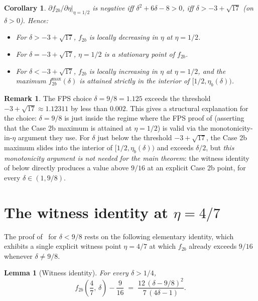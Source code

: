 \documentclass[11pt,a4paper]{article}
\newtheorem{lemma}[theorem]{Lemma}
\newtheorem{corollary}[theorem]{Corollary}
\theoremstyle{definition}
\newtheorem{remark}[theorem]{Remark}
\begin{document}
\begin{corollary}\label{cor:transition}
$\left.\partial f_{2b}/\partial \eta\right|_{\eta = 1/2}$ is negative
iff $\delta^2 + 6\delta - 8 > 0$, iff $\delta > -3 + \sqrt{17}$
(on $\delta > 0$). Hence:
\begin{itemize}
\item For $\delta > -3 + \sqrt{17}$, $f_{2b}$ is locally decreasing
  in $\eta$ at $\eta = 1/2$.
\item For $\delta = -3 + \sqrt{17}$, $\eta = 1/2$ is a stationary
  point of $f_{2b}$.
\item For $\delta < -3 + \sqrt{17}$, $f_{2b}$ is locally increasing
  in $\eta$ at $\eta = 1/2$, and the maximum
  $f_{2b}^{\max}(\delta)$ is attained strictly in the interior of
  $[1/2, \eta_b(\delta))$.
\end{itemize}
\end{corollary}

\begin{remark}\label{rem:fpschoice}
The FPS choice $\delta = 9/8 = 1.125$ exceeds the threshold
$-3 + \sqrt{17} \approx 1.12311$ by less than $0.002$. This
gives a structural explanation for the choice: $\delta = 9/8$ is
just inside the regime where the FPS proof of \cite[Claim 3.7,
Case 2b]{FPS} (asserting that the Case 2b maximum is attained at
$\eta = 1/2$) is valid via the monotonicity-in-$\eta$ argument they
use. For $\delta$ just below the threshold $-3 + \sqrt{17}$, the
Case 2b maximum slides into the interior of $[1/2, \eta_b(\delta))$
and exceeds $\delta/2$, but \emph{this monotonicity argument is
not needed for the main theorem}: the witness identity of
 below directly produces a value above $9/16$ at
an explicit Case 2b point, for every $\delta \in (1, 9/8)$.
\end{remark}

\section{The witness identity at $\eta = 4/7$}\label{sec:witness}

The proof of~ for $\delta < 9/8$ rests on the
following elementary identity, which exhibits a single explicit
witness point $\eta = 4/7$ at which $f_{2b}$ already exceeds
$9/16$ whenever $\delta \neq 9/8$.

\begin{lemma}[Witness identity]\label{lem:witness}
For every $\delta > 1/4$,
\begin{equation}\label{eq:witness}
   f_{2b}\!\left(\frac{4}{7},\,\delta\right) - \frac{9}{16}
   \;=\;
   \frac{12\,(\delta - 9/8)^2}{7\,(4\delta - 1)}.
\end{equation}
\end{lemma}
\end{document}
